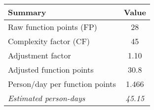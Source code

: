\begin{tabular}{l|c}
\textbf{Summary} & \textbf{Value} \\ \hline
Raw function points (FP) & 28 \\
Complexity factor (CF) & 45 \\
Adjustment factor & 1.10 \\
Adjusted function points & 30.8 \\
Person/day per function points & 1.466 \\ \hline
\textit{Estimated person-days} & \textit{45.15}
\end{tabular}
